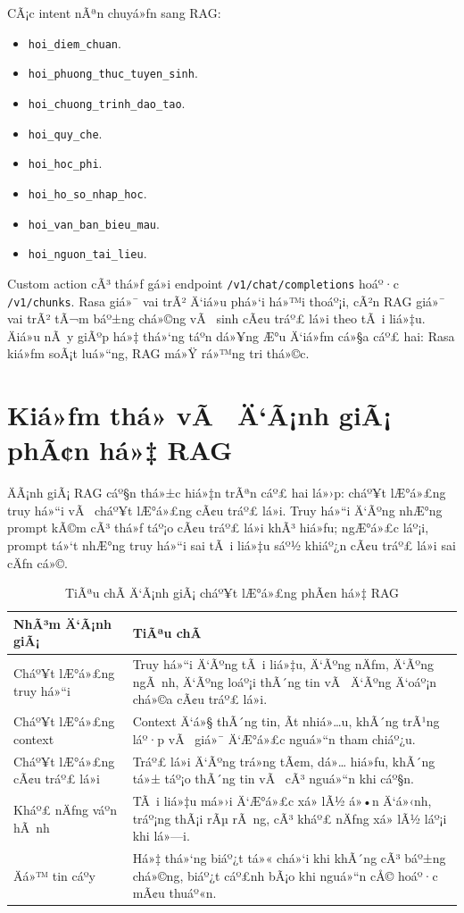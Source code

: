 ﻿\documentclass[12pt,a4paper]{report}
\begin{document}
CÃ¡c intent nÃªn chuyá»ƒn sang RAG:

\begin{itemize}
    \item \texttt{hoi\_diem\_chuan}.
    \item \texttt{hoi\_phuong\_thuc\_tuyen\_sinh}.
    \item \texttt{hoi\_chuong\_trinh\_dao\_tao}.
    \item \texttt{hoi\_quy\_che}.
    \item \texttt{hoi\_hoc\_phi}.
    \item \texttt{hoi\_ho\_so\_nhap\_hoc}.
    \item \texttt{hoi\_van\_ban\_bieu\_mau}.
    \item \texttt{hoi\_nguon\_tai\_lieu}.
\end{itemize}

Custom action cÃ³ thá»ƒ gá»i endpoint \texttt{/v1/chat/completions} hoáº·c \texttt{/v1/chunks}. Rasa giá»¯ vai trÃ² Ä‘iá»u phá»‘i há»™i thoáº¡i, cÃ²n RAG giá»¯ vai trÃ² tÃ¬m báº±ng chá»©ng vÃ  sinh cÃ¢u tráº£ lá»i theo tÃ i liá»‡u. Äiá»u nÃ y giÃºp há»‡ thá»‘ng táº­n dá»¥ng Æ°u Ä‘iá»ƒm cá»§a cáº£ hai: Rasa kiá»ƒm soÃ¡t luá»“ng, RAG má»Ÿ rá»™ng tri thá»©c.

\section{Kiá»ƒm thá»­ vÃ  Ä‘Ã¡nh giÃ¡ phÃ¢n há»‡ RAG}

ÄÃ¡nh giÃ¡ RAG cáº§n thá»±c hiá»‡n trÃªn cáº£ hai lá»›p: cháº¥t lÆ°á»£ng truy há»“i vÃ  cháº¥t lÆ°á»£ng cÃ¢u tráº£ lá»i. Truy há»“i Ä‘Ãºng nhÆ°ng prompt kÃ©m cÃ³ thá»ƒ táº¡o cÃ¢u tráº£ lá»i khÃ³ hiá»ƒu; ngÆ°á»£c láº¡i, prompt tá»‘t nhÆ°ng truy há»“i sai tÃ i liá»‡u sáº½ khiáº¿n cÃ¢u tráº£ lá»i sai cÄƒn cá»©.

\begin{table}[H]
\centering
\begin{tabular}{|p{4cm}|p{8.8cm}|}
\hline
\textbf{NhÃ³m Ä‘Ã¡nh giÃ¡} & \textbf{TiÃªu chÃ­} \\
\hline
Cháº¥t lÆ°á»£ng truy há»“i & Truy há»“i Ä‘Ãºng tÃ i liá»‡u, Ä‘Ãºng nÄƒm, Ä‘Ãºng ngÃ nh, Ä‘Ãºng loáº¡i thÃ´ng tin vÃ  Ä‘Ãºng Ä‘oáº¡n chá»©a cÃ¢u tráº£ lá»i. \\
\hline
Cháº¥t lÆ°á»£ng context & Context Ä‘á»§ thÃ´ng tin, Ã­t nhiá»…u, khÃ´ng trÃ¹ng láº·p vÃ  giá»¯ Ä‘Æ°á»£c nguá»“n tham chiáº¿u. \\
\hline
Cháº¥t lÆ°á»£ng cÃ¢u tráº£ lá»i & Tráº£ lá»i Ä‘Ãºng trá»ng tÃ¢m, dá»… hiá»ƒu, khÃ´ng tá»± táº¡o thÃ´ng tin vÃ  cÃ³ nguá»“n khi cáº§n. \\
\hline
Kháº£ nÄƒng váº­n hÃ nh & TÃ i liá»‡u má»›i Ä‘Æ°á»£c xá»­ lÃ½ á»•n Ä‘á»‹nh, tráº¡ng thÃ¡i rÃµ rÃ ng, cÃ³ kháº£ nÄƒng xá»­ lÃ½ láº¡i khi lá»—i. \\
\hline
Äá»™ tin cáº­y & Há»‡ thá»‘ng biáº¿t tá»« chá»‘i khi khÃ´ng cÃ³ báº±ng chá»©ng, biáº¿t cáº£nh bÃ¡o khi nguá»“n cÅ© hoáº·c mÃ¢u thuáº«n. \\
\hline
\end{tabular}
\caption{TiÃªu chÃ­ Ä‘Ã¡nh giÃ¡ cháº¥t lÆ°á»£ng phÃ¢n há»‡ RAG}
\label{tab:rag-evaluation-criteria}
\end{table}
\end{document}
